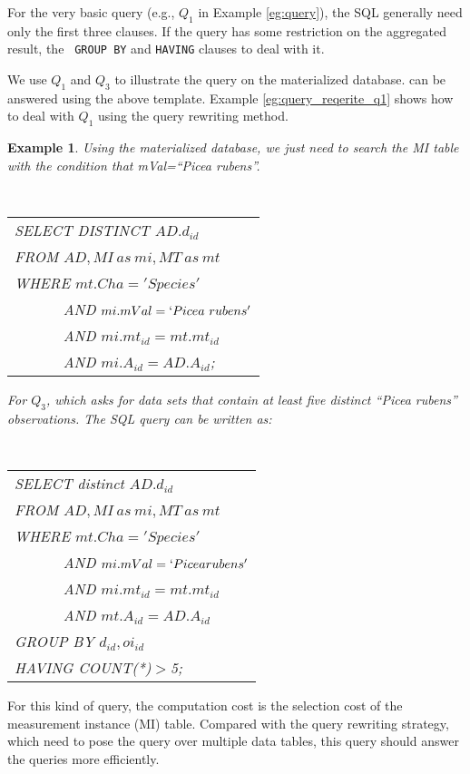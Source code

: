 \documentclass[conference]{IEEEtran}
\newtheorem{example}{Example}[section]
\begin{document}
For the very basic query (e.g., $Q_1$ in Example \ref{eg:query}), the
SQL generally need only the first three clauses. 
If the query has some restriction on the aggregated result, the {\tt
  GROUP BY} and {\tt HAVING} clauses to deal with it. 

We use $Q_1$ and $Q_3$ to illustrate the query on the materialized
database. 
can be answered using the above
template. 
Example \ref{eg:query_reqerite_q1} shows how to deal with $Q_1$ using
the query rewriting method. 

\begin{example} \label{eg:materialize_db_q1}
Using the  materialized database,  we just need to search the MI table
with the condition that {\em mVal=``Picea rubens''}.

\vspace{0.1in}
{\tt 
\begin{tabular}{l}
SELECT DISTINCT $AD.d_{id}$\\
FROM $AD, MI~as~mi, MT~as~mt$\\ 
WHERE $mt.Cha='Species'$ \\
$\qquad\quad$ AND $mi.mVal = `Picea~rubens'$\\
$\qquad\quad$ AND $mi.mt_{id}=mt.mt_{id}$\\
$\qquad\quad$ AND $mi.A_{id}=AD.A_{id}$; 
\end{tabular}
}
\vspace{0.1in}

For $Q_3$, which asks for data sets that contain at
least five distinct ``Picea rubens'' observations.
The SQL query can be written as: 

\vspace{0.1in}
{\tt 
\begin{tabular}{l}
SELECT distinct $AD.d_{id}$\\
FROM $AD, MI~as~mi, MT~as~mt$\\
WHERE $mt.Cha='Species'$ \\
$\qquad\quad$ AND $mi.mVal = `Picea rubens'$\\
$\qquad\quad$ AND $mi.mt_{id}=mt.mt_{id}$\\
$\qquad\quad$ AND $mt.A_{id}=AD.A_{id}$\\
GROUP BY $d_{id},oi_{id}$\\
HAVING COUNT(*)$>$5; 
}
\end{tabular}
}
\vspace{0.1in}
\end{example}

For this kind of query, the computation cost is the selection cost of the
measurement instance (MI) table. 
Compared with the query rewriting strategy, which need to pose the
query over multiple data tables, this query should answer the queries
more efficiently. 
\end{document}
